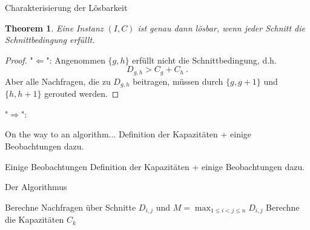 \documentclass[8pt]{beamer}
\newcommand{\N}{\mathbb{N}}
\theoremstyle{claim}
\newtheorem{mytheorem}[theorem]{Theorem}
\begin{document}
	\begin{frame}{Charakterisierung der Lösbarkeit}
		\begin{mytheorem}
			Eine Instanz $(I, C)$ ist genau dann lösbar, wenn jeder Schnitt die Schnittbedingung erfüllt.
		\end{mytheorem}\pause
		\begin{proof}\let\qed\relax
			"$\Leftarrow$": Angenommen $\{g, h\}$ erfüllt nicht die Schnittbedingung, d.h.
			\begin{equation}
				D_{g, h} > C_g + C_h \ .
			\end{equation}\pause
			Aber alle Nachfragen, die zu $D_{g, h}$ beitragen, müssen durch $\{g, g+1\}$ und $\{h, h+1\}$ gerouted werden.
		\end{proof}
		\begin{center}
			\scalebox{0.8}{
			
		}
	\end{center}
	\end{frame}

	\begin{frame}[t]
		"$\Rightarrow$":
	\end{frame}

	\begin{frame}{On the way to an algorithm...}
		Definition der Kapazitäten + einige Beobachtungen dazu.
	\end{frame}

	\begin{frame}{Einige Beobachtungen}
		Definition der Kapazitäten + einige Beobachtungen dazu.
	\end{frame}

	\begin{frame}{Der Algorithmus}
		\begin{center}
			\begin{algorithm}[H]
				\begin{mdframed}[backgroundcolor=green!10,linecolor=white]
					\KwIn{Ring size $n \in \N$, demands $d_{i,j}$, $1 \leq i < j \leq n$.}
					\nl Berechne Nachfragen über Schnitte $D_{i, j}$ und $M = \max_{1 \leq i < j \leq n} D_{i,j}$\;
					\nl Berechne die Kapazitäten $C_k$\;
					\nl{}
					\nl{}
				\end{mdframed}
			\end{algorithm}
		\end{center}
	\end{frame}
\end{document}
